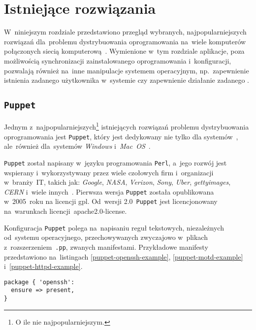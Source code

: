 \documentclass[thesis]{subfiles}
\begin{document}

\section{Istniejące rozwiązania}
\label{sec:istniejace-rozwiazania}

W~niniejszym rozdziale przedstawiono przegląd wybranych, najpopularniejszych rozwiązań dla~problemu dystrybuowania oprogramowania na~wiele komputerów połączonych siecią komputerową~\cite{leading-scms}. Wymienione w~tym rozdziale aplikacje, poza możliwością synchronizacji zainstalowanego oprogramowania i~konfiguracji, pozwalają również na~inne manipulacje systemem operacyjnym, np.~zapewnienie istnienia zadanego użytkownika w~systemie czy zapewnienie działanie zadanego .

\subsection{\texttt{Puppet}}

Jednym z~najpopularniejszych\footnote{O ile nie najpopularniejszym.} istniejących rozwiązań problemu dystrybuowania oprogramowania jest \texttt{Puppet}, który jest dedykowany nie tylko dla systemów~, ale~również dla~systemów \emph{Windows} i~\emph{Mac~OS}~\cite{puppet,puppet-examples,puppet-clients}.

\texttt{Puppet} został napisany w~języku programowania \texttt{Perl}, a~jego rozwój jest wspierany i~wykorzystywany przez wiele czołowych firm i~organizacji w~branży~IT, takich jak: \emph{Google}, \emph{NASA}, \emph{Verizon}, \emph{Sony}, \emph{Uber}, \emph{gettyimages}, \emph{CERN} i~wiele innych~\cite{puppet,puppet-cern,puppet-google}. Pierwsza wersja \texttt{Puppet} została opublikowana w~2005~roku na licencji \gls{gpl}. Od~wersji 2.0~\texttt{Puppet} jest licencjonowany na~warunkach licencji~\gls{apache2.0-license}.

Konfiguracja \texttt{Puppet} polega na~napisaniu reguł tekstowych, niezależnych od~systemu operacyjnego, przechowywanych zwyczajowo w~plikach z~rozszerzeniem~\texttt{.pp}, zwanych manifestami. Przykładowe manifesty przedstawiono na~listingach \ref{puppet-openssh-example}, \ref{puppet-motd-example} i~\ref{puppet-httpd-example}.

\begin{lstlisting}[numbers=none,caption={Manifest \texttt{Puppet} gwarantujący, że \texttt{OpenSSH} jest zainstalowany},label=puppet-openssh-example]
package { 'openssh':
  ensure => present,
}
\end{lstlisting}
\end{document}
